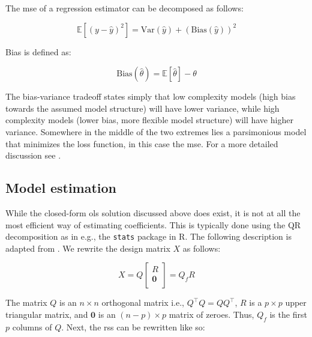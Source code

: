 \documentclass{report}
\begin{document}
The \gls{mse} of a regression estimator can be decomposed as follows:

\begin{equation}\label{eq:bias-variance-tradeoff}
    \mathbb{E}\left[\left(y - \hat{y}\right)^2\right] = \text{Var}\left(\hat{y}\right) + \left(\text{Bias}\left(\hat{y}\right)\right)^2
\end{equation}

Bias is defined as:

\begin{equation}\label{eq:bias}
    \text{Bias}\left(\hat{\theta}\right) = \mathbb{E}\left[\hat{\theta}\right] - \theta
\end{equation}

The bias-variance tradeoff states simply that low complexity models (high bias towards the assumed model structure) will have lower variance, while high complexity models (lower bias, more flexible model structure) will have higher variance. Somewhere in the middle of the two extremes lies a parsimonious model that minimizes the loss function, in this case the \gls{mse}. For a more detailed discussion see \cite[Chapter~2.9]{hastie_elements_2009}. 

\subsection{Model estimation}

While the closed-form \gls{ols} solution discussed above does exist, it is not at all the most efficient way of estimating coefficients. This is typically done using the QR decomposition as in e.g., the \texttt{stats} package in R. The following description is adapted from \cite[Chapter~2.7]{faraway_linear_2015}. We rewrite the design matrix $X$ as follows:

\begin{equation}\label{eq:ols-qr-decomp}
    X = Q \begin{bmatrix}
        R \\
        \symbf{0} \\
    \end{bmatrix} = Q_fR 
\end{equation}

The matrix $Q$ is an $n\times n$ orthogonal matrix i.e., $Q^\intercal Q = QQ^\intercal$, $R$ is a $p\times p$ upper triangular matrix, and $\symbf{0}$ is an $(n-p)\times p$ matrix of zeroes. Thus, $Q_f$ is the first $p$ columns of $Q$. Next, the \gls{rss} can be rewritten like so:
\end{document}
